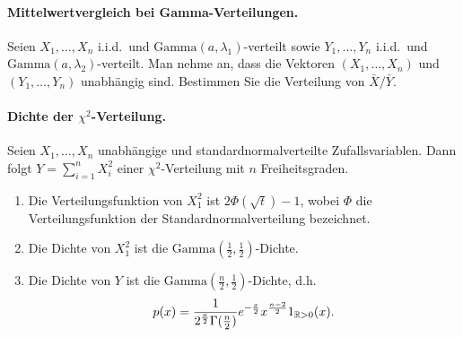 \paragraph{Mittelwertvergleich bei Gamma-Verteilungen. }
Seien $X_1,\ldots,X_n$ i.i.d.\ und $\textrm{Gamma}(a, \lambda_1)$-verteilt sowie
$Y_1,\ldots,Y_n$ i.i.d.\ und $\textrm{Gamma}(a,\lambda_2)$-verteilt. Man nehme an,
dass die Vektoren $(X_1,\ldots,X_n)$ und $(Y_1,\ldots,Y_n)$ unabhängig sind. 
Bestimmen Sie die Verteilung von $\bar X/\bar Y$.

\paragraph{Dichte der $\chi^2$-Verteilung. } 
Seien $X_1,\ldots,X_n$ unabhängige und standardnormalverteilte
Zufallsvariablen. Dann folgt $Y= \sum_{i=1}^{n} X_i^2$ einer
$\chi^2$-Verteilung mit $n$ Freiheitsgraden. 
\begin{enumerate}
    \item Die Verteilungsfunktion von $X_1^2$ ist $2\Phi(\sqrt{t})-1$, wobei
        $\Phi$ die Verteilungsfunktion der Standardnormalverteilung bezeichnet. 
    \item Die Dichte von $X_1^2$ ist die $\text{Gamma}(\frac{1}{2},\frac{1}{2})$-Dichte. 
    \item Die Dichte von $Y$ ist die $\text{Gamma}(\frac{n}{2},\frac{1}{2})$-Dichte, d.h.\
        \begin{equation*}
            p(x) = \frac{1}{ 2^{\frac{n}{2}} 
            \Gamma(\frac{n}{2})}e^{-\frac{x}{2}} x^{\frac{n-2}{2}} 1_{\mathbb R>0}(x).
        \end{equation*}
\end{enumerate}
